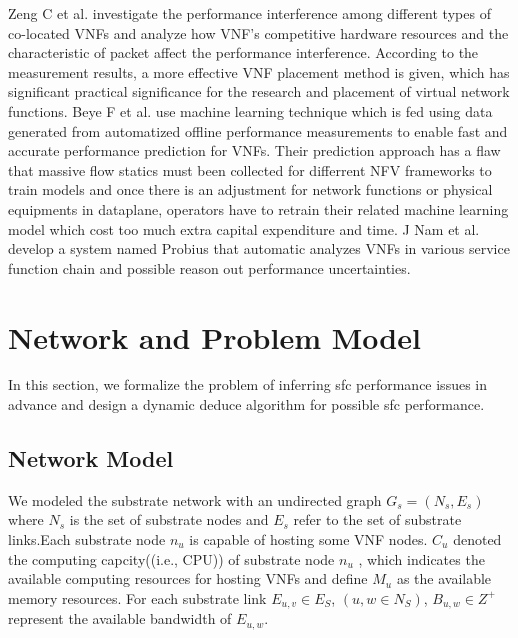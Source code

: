 \documentclass{ieeeaccess}
\begin{document}
Zeng C et al.\cite{b20} investigate the performance interference among different types of co-located VNFs and analyze how VNF’s competitive hardware resources and the characteristic of packet affect the performance interference. According to the measurement results, a more effective VNF placement method is given, which has significant practical significance for the research and placement of virtual network functions. Beye F et al.\cite{b21} use machine learning technique which is fed using data generated from automatized offline performance measurements to enable fast and accurate performance prediction for VNFs. Their prediction approach has a flaw that massive flow statics must been collected for differrent NFV frameworks to train models and once there is an adjustment for network functions or physical equipments in dataplane, operators have to retrain their related machine learning model which cost too much extra capital expenditure and time. J Nam et al.\cite{b22} develop a system named Probius that automatic analyzes VNFs in various service function chain and possible reason out performance uncertainties.

\section{Network and Problem Model}
In this section, we formalize the problem of inferring sfc performance issues in advance and design a dynamic deduce algorithm for possible sfc performance.

\subsection{Network Model}
We modeled the substrate network with an undirected graph $G_{s}=\left ( N_{s},E_{s} \right )$ where $N_{s}$ is the set of substrate nodes and $E_{s}$ refer to the set of substrate links.Each substrate node $n_{u}$ is capable of hosting some VNF nodes. $C_{u}$ denoted the computing capcity((i.e., CPU)) of substrate node $n_{u}$ , which indicates the available computing resources for hosting VNFs and define $M_{u}$ as the available memory resources. For each substrate link $E_{u,v} \in E_{S}$, $(u,w \in N_{S})$, $ B_{u,w}\in Z^{+} $ represent  the available bandwidth of $E_{u,w}$.
\end{document}
